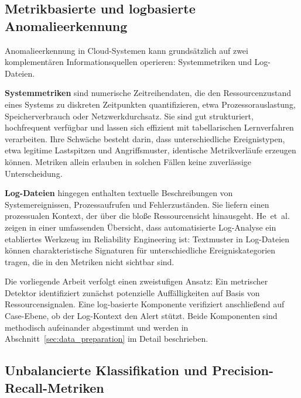 \subsection{Metrikbasierte und logbasierte Anomalieerkennung}

Anomalieerkennung in Cloud-Systemen kann grundsätzlich auf zwei komplementären
Informationsquellen operieren: Systemmetriken und Log-Dateien.

\textbf{Systemmetriken} sind numerische Zeitreihendaten, die den Ressourcenzustand
eines Systems zu diskreten Zeitpunkten quantifizieren, etwa Prozessorauslastung,
Speicherverbrauch oder Netzwerkdurchsatz. Sie sind gut strukturiert, hochfrequent
verfügbar und lassen sich effizient mit tabellarischen Lernverfahren verarbeiten.
Ihre Schwäche besteht darin, dass unterschiedliche Ereignistypen, etwa legitime
Lastspitzen und Angriffsmuster, identische Metrikverläufe erzeugen können. Metriken
allein erlauben in solchen Fällen keine zuverlässige Unterscheidung.

\textbf{Log-Dateien} hingegen enthalten textuelle Beschreibungen von Systemereignissen,
Prozessaufrufen und Fehlerzuständen. Sie liefern einen prozessualen Kontext, der über
die bloße Ressourcensicht hinausgeht. He~et~al.~\cite{he2021survey} zeigen in einer
umfassenden Übersicht, dass automatisierte Log-Analyse ein etabliertes Werkzeug im
Reliability Engineering ist: Textmuster in Log-Dateien können charakteristische
Signaturen für unterschiedliche Ereigniskategorien tragen, die in den Metriken nicht
sichtbar sind.

Die vorliegende Arbeit verfolgt einen zweistufigen Ansatz: Ein metrischer Detektor
identifiziert zunächst potenzielle Auffälligkeiten auf Basis von Ressourcensignalen.
Eine log-basierte Komponente verifiziert anschließend auf Case-Ebene, ob der
Log-Kontext den Alert stützt. Beide Komponenten sind methodisch aufeinander abgestimmt
und werden in Abschnitt~\ref{sec:data_preparation} im Detail beschrieben.

\subsection{Unbalancierte Klassifikation und Precision-Recall-Metriken}

